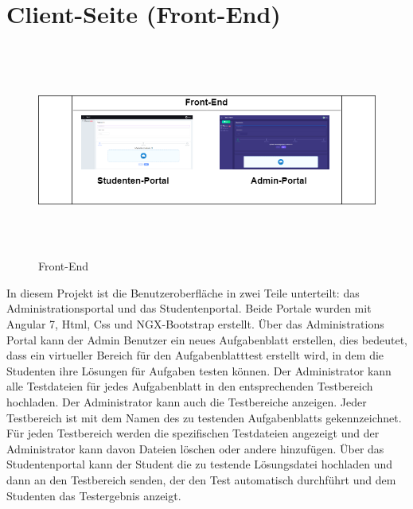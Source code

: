 \documentclass[a4paper,12pt,oneside]{book}
\begin{document}
\section{Client-Seite (Front-End)}
\begin{figure}[h!]
	\begin{center}
		\includegraphics[width=14cm, height=7cm]{FrontEnd.png}
		\caption{Front-End } 
		\label{ Front-End } 
	\end{center}
\end{figure}
In diesem Projekt ist die Benutzeroberfläche in zwei Teile unterteilt: das Administrationsportal und das Studentenportal. Beide Portale wurden mit Angular 7, Html, Css und NGX-Bootstrap erstellt.
Über das Administrations Portal kann der Admin Benutzer ein neues Aufgabenblatt erstellen, dies bedeutet, dass ein virtueller Bereich für den Aufgabenblatttest erstellt wird, in dem die Studenten ihre Lösungen für Aufgaben testen können. Der Administrator kann alle Testdateien für jedes Aufgabenblatt in den entsprechenden Testbereich hochladen. Der Administrator kann auch die Testbereiche anzeigen. Jeder Testbereich ist mit dem Namen des zu testenden Aufgabenblatts gekennzeichnet. Für jeden Testbereich werden die spezifischen Testdateien angezeigt und der Administrator kann davon Dateien löschen oder andere hinzufügen.
Über das Studentenportal kann der Student die zu testende Lösungsdatei hochladen und dann an den Testbereich senden, der den Test automatisch durchführt und dem Studenten das Testergebnis anzeigt.
\end{document}
